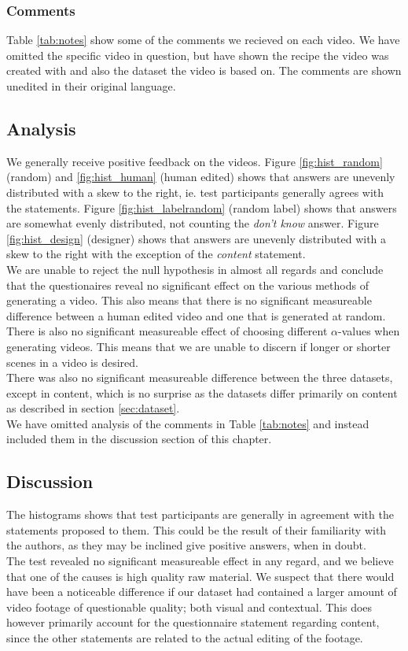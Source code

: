 \subsubsection{Comments}\label{sec:comments}
%
Table \ref{tab:notes} show some of the comments we recieved on each video. We have omitted the specific video in question, but have shown the recipe the video was created with and also the dataset the video is based on. The comments are shown unedited in their original language.
%

%
\subsection{Analysis}
%
We generally receive positive feedback on the videos. Figure \ref{fig:hist_random} (random) and \ref{fig:hist_human} (human edited) shows that answers are unevenly distributed with a skew to the right, ie. test participants generally agrees with the statements. Figure \ref{fig:hist_labelrandom} (random label) shows that answers are somewhat evenly distributed, not counting the \textit{don't know} answer. Figure \ref{fig:hist_design} (designer) shows that answers are unevenly distributed with a skew to the right with the exception of the \textit{content} statement.\\
We are unable to reject the null hypothesis in almost all regards and conclude that the questionaires reveal no significant effect on the various methods of generating a video. This also means that there is no significant measureable difference between a human edited video and one that is generated at random.\\
%
There is also no significant measureable effect of choosing different $\alpha$-values when generating videos. This means that we are unable to discern if longer or shorter scenes in a video is desired.\\
%
There was also no significant measureable difference between the three datasets, except in content, which is no surprise as the datasets differ primarily on content as described in section \ref{sec:dataset}.\\
%
We have omitted analysis of the comments in Table \ref{tab:notes} and instead included them in the discussion section of this chapter.\\
%
\subsection{Discussion}
%
The histograms shows that test participants are generally in agreement with the statements proposed to them. This could be the result of their familiarity with the authors, as they may be inclined give positive answers, when in doubt.\\
The test revealed no significant measureable effect in any regard, and we believe that one of the causes is high quality raw material. We suspect that there would have been a noticeable difference if our dataset had contained a larger amount of video footage of questionable quality; both visual and contextual. This does however primarily account for the questionnaire statement regarding content, since the other statements are related to the actual editing of the footage.
%
